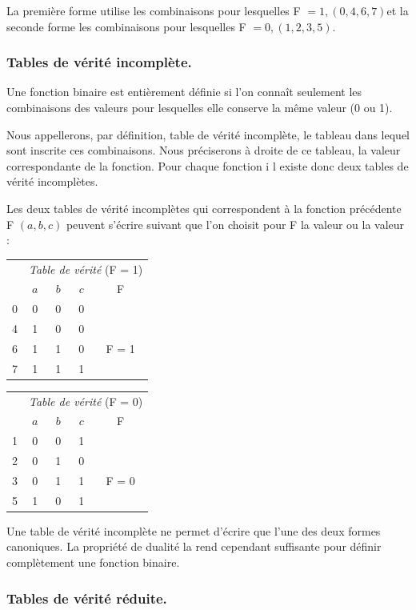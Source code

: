 La première forme utilise les combinaisons pour lesquelles F $=1,(0,4,6,7)$et
la seconde forme les combinaisons pour lesquelles F $=0,(1,2,3,5)$.

\subsubsection{Tables de vérité incomplète. }

\textendash{} Une fonction binaire est entièrement définie si l'on
connaît seulement les combinaisons des valeurs pour lesquelles elle
conserve la même valeur (0 ou 1).

Nous appellerons, par définition, table de vérité incomplète, le tableau
dans lequel sont inscrite ces combinaisons. Nous préciserons à droite
de ce tableau, la valeur correspondante de la fonction. Pour chaque
fonction i l existe  donc deux tables de vérité incomplètes.

Les deux tables de vérité incomplètes qui correspondent à la fonction
précédente F $(a,b,c)$ peuvent s'écrire suivant que l'on choisit
pour \og F \fg{} la valeur  \fg{} ou la valeur  \fg{}
: 

\bigskip 

\begin{tabular}{c|c|c|c||c|}
\multicolumn{1}{c}{} & \multicolumn{4}{c}{\emph{Table de vérité }(F = 1)}\tabularnewline
\cline{2-5} 
 & $a$ & $b$ & $c$ & F\tabularnewline
\cline{2-5} 
0 & 0 & 0 & 0 & \tabularnewline
4 & 1 & 0 & 0 & \tabularnewline
6 & 1 & 1 & 0 & F = 1\tabularnewline
7 & 1 & 1 & 1 & \tabularnewline
\cline{2-5} 
\end{tabular}\hspace*{\fill}%
\begin{tabular}{c|c|c|c||c|}
\multicolumn{1}{c}{} & \multicolumn{4}{c}{\emph{Table de vérité }(F = 0)}\tabularnewline
\cline{2-5} 
 & $a$ & $b$ & $c$ & F\tabularnewline
\cline{2-5} 
1 & 0 & 0 & 1 & \tabularnewline
2 & 0 & 1 & 0 & \tabularnewline
3 & 0 & 1 & 1 & F = 0\tabularnewline
5 & 1 & 0 & 1 & \tabularnewline
\cline{2-5} 
\end{tabular}\hspace*{1cm}

\bigskip{}

Une table de vérité incomplète ne permet d'écrire que l'une des deux
formes canoniques. La propriété de dualité la rend cependant suffisante
pour définir complètement une fonction binaire.

\subsubsection{Tables de vérité réduite.}

